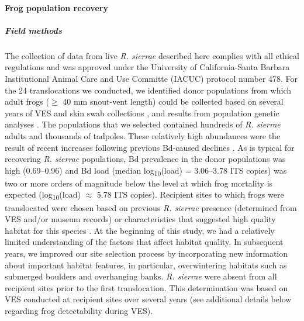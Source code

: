\documentclass[
  letterpaper,
  DIV=11,
  numbers=noendperiod]{scrartcl}
\let\oldparagraph\paragraph
\renewcommand{\paragraph}[1]{\oldparagraph{#1}\mbox{}}
\let\oldsubparagraph\subparagraph
\renewcommand{\subparagraph}[1]{\oldsubparagraph{#1}\mbox{}}
\begin{document}
\paragraph{Frog population recovery}\label{frog-population-recovery-1}

\subparagraph{Field methods}\label{field-methods}

The collection of data from live \emph{R. sierrae} described here
complies with all ethical regulations and was approved under the
University of California-Santa Barbara Institutional Animal Care and Use
Committe (IACUC) protocol number 478. For the 24 translocations we
conducted, we identified donor populations from which adult frogs
(\(\geq\) 40 mm snout-vent length) could be collected based on several
years of VES and skin swab collections \citep{knapp2016}, and results
from population genetic analyses \citep{poorten2017}. The populations
that we selected contained hundreds of \emph{R. sierrae} adults and
thousands of tadpoles. These relatively high abundances were the result
of recent increases following previous Bd-caused declines
\citep{knapp2016}. As is typical for recovering \emph{R. sierrae}
populations, Bd prevalence in the donor populations was high
(0.69--0.96) and Bd load (median log\textsubscript{10}(load) =
3.06--3.78 ITS copies) was two or more orders of magnitude below the
level at which frog mortality is expected
\citep{vredenburg2010, joseph2018} (log\textsubscript{10}(load)
\(\approx\) 5.78 ITS copies). Recipient sites to which frogs were
translocated were chosen based on previous \emph{R. sierrae} presence
(determined from VES and/or museum records) or characteristics that
suggested high quality habitat for this species \citep{knapp2005}. At
the beginning of this study, we had a relatively limited understanding
of the factors that affect habitat quality. In subsequent years, we
improved our site selection process by incorporating new information
about important habitat features, in particular, overwintering habitats
such as submerged boulders and overhanging banks. \emph{R. sierrae} were
absent from all recipient sites prior to the first translocation. This
determination was based on VES conducted at recipient sites over several
years (see additional details below regarding frog detectability during
VES).
\end{document}
